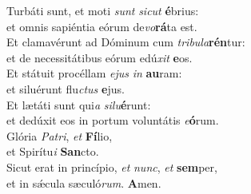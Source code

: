 \oddverse Turbáti sunt, et moti \textit{sunt} \textit{si}\textit{cut} \textbf{é}brius:~\*\\
\oddverse et omnis sapiéntia eórum de\textit{vo}\textbf{rá}ta est.\\
\evenverse Et clamavérunt ad Dóminum cum \textit{tri}\textit{bu}\textit{la}\textbf{rén}tur:~\*\\
\evenverse et de necessitátibus eórum edú\textit{xit} \textbf{e}os.\\
\oddverse Et státuit procéllam \textit{e}\textit{jus} \textit{in} \textbf{au}ram:~\*\\
\oddverse et siluérunt flu\textit{ctus} \textbf{e}jus.\\
\evenverse Et lætáti sunt qui\textit{a} \textit{si}\textit{lu}\textbf{é}runt:~\*\\
\evenverse et dedúxit eos in portum voluntátis \textit{e}\textbf{ó}rum.\\
\oddverse Glória \textit{Pa}\textit{tri}, \textit{et} \textbf{Fí}lio,~\*\\
\oddverse et Spirítu\textit{i} \textbf{San}cto.\\
\evenverse Sicut erat in princípio, \textit{et} \textit{nunc}, \textit{et} \textbf{sem}per,~\*\\
\evenverse et in sǽcula sæculó\textit{rum}. \textbf{A}men.\\
